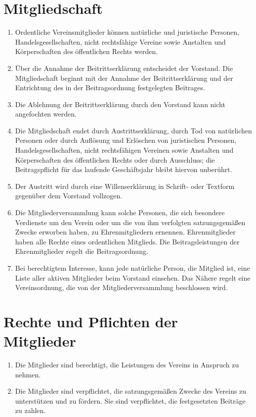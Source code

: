 \documentclass[a4paper]{article}
\begin{document}
\section{Mitgliedschaft}
\begin{enumerate}
	\item Ordentliche Vereinsmitglieder können natürliche und juristische Personen, Handelsgesellschaften, nicht rechtsfähige Vereine sowie Anstalten und Körperschaften des öffentlichen Rechts werden.
	\item Über die Annahme der Beitrittserklärung entscheidet der Vorstand. Die Mitgliedschaft beginnt mit der Annahme der Beitrittserklärung und der Entrichtung des in der Beitragsordnung festgelegten Beitrages.
	\item Die Ablehnung der Beitrittserklärung durch den Vorstand kann nicht angefochten werden.
	\item Die Mitgliedschaft endet durch Austrittserklärung, durch Tod von natürlichen Personen oder durch Auflösung und Erlöschen von juristischen Personen, Handelsgesellschaften, nicht rechtsfähigen Vereinen sowie Anstalten und Körperschaften des öffentlichen Rechts oder durch Ausschluss; die Beitragspflicht für das laufende Geschäftsjahr bleibt hiervon unberührt.
	\item Der Austritt wird durch eine Willenserklärung in Schrift- oder Textform gegenüber dem Vorstand vollzogen.
	\item Die Mitgliederversammlung kann solche Personen, die sich besondere Verdienste um den Verein oder um die von ihm verfolgten satzungsgemäßen Zwecke erworben haben, zu Ehrenmitgliedern ernennen. Ehrenmitglieder haben alle Rechte eines ordentlichen Mitglieds. Die Beitragsleistungen der Ehrenmitglieder regelt die Beitragsordnung.
	\item Bei berechtigtem Interesse, kann jede natürliche Person, die Mitglied ist, eine Liste aller aktiven Mitglieder beim Vorstand einsehen. Das Nähere regelt eine Vereinsordnung, die von der Mitgliederversammlung beschlossen wird.
\end{enumerate}

\section{Rechte und Pflichten der Mitglieder}
\begin{enumerate}
	\item Die Mitglieder sind berechtigt, die Leistungen des Vereins in Anspruch zu nehmen.
	\item Die Mitglieder sind verpflichtet, die satzungsgemäßen Zwecke des Vereins zu unterstützen und zu fördern. Sie sind verpflichtet, die festgesetzten Beiträge zu zahlen.
\end{enumerate}
\end{document}
